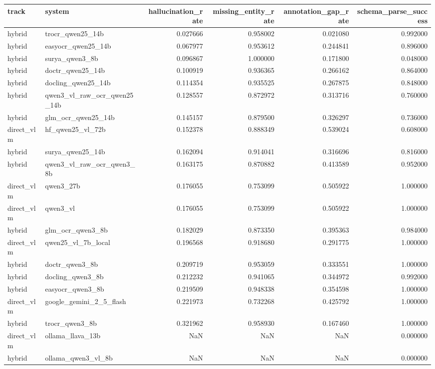 \begin{tabular}{llrrrr}
\toprule
track & system & hallucination\_rate & missing\_entity\_rate & annotation\_gap\_rate & schema\_parse\_success \\
\midrule
hybrid & trocr\_qwen25\_14b & 0.027666 & 0.958002 & 0.021080 & 0.992000 \\
hybrid & easyocr\_qwen25\_14b & 0.067977 & 0.953612 & 0.244841 & 0.896000 \\
hybrid & surya\_qwen3\_8b & 0.096867 & 1.000000 & 0.171800 & 0.048000 \\
hybrid & doctr\_qwen25\_14b & 0.100919 & 0.936365 & 0.266162 & 0.864000 \\
hybrid & docling\_qwen25\_14b & 0.114354 & 0.935525 & 0.267875 & 0.848000 \\
hybrid & qwen3\_vl\_raw\_ocr\_qwen25\_14b & 0.128557 & 0.872972 & 0.313716 & 0.760000 \\
hybrid & glm\_ocr\_qwen25\_14b & 0.145157 & 0.879500 & 0.326297 & 0.736000 \\
direct\_vlm & hf\_qwen25\_vl\_72b & 0.152378 & 0.888349 & 0.539024 & 0.608000 \\
hybrid & surya\_qwen25\_14b & 0.162094 & 0.914041 & 0.316696 & 0.816000 \\
hybrid & qwen3\_vl\_raw\_ocr\_qwen3\_8b & 0.163175 & 0.870882 & 0.413589 & 0.952000 \\
direct\_vlm & qwen3\_27b & 0.176055 & 0.753099 & 0.505922 & 1.000000 \\
direct\_vlm & qwen3\_vl & 0.176055 & 0.753099 & 0.505922 & 1.000000 \\
hybrid & glm\_ocr\_qwen3\_8b & 0.182029 & 0.873350 & 0.395363 & 0.984000 \\
direct\_vlm & qwen25\_vl\_7b\_local & 0.196568 & 0.918680 & 0.291775 & 1.000000 \\
hybrid & doctr\_qwen3\_8b & 0.209719 & 0.953059 & 0.333551 & 1.000000 \\
hybrid & docling\_qwen3\_8b & 0.212232 & 0.941065 & 0.344972 & 0.992000 \\
hybrid & easyocr\_qwen3\_8b & 0.219509 & 0.948338 & 0.354598 & 1.000000 \\
direct\_vlm & google\_gemini\_2\_5\_flash & 0.221973 & 0.732268 & 0.425792 & 1.000000 \\
hybrid & trocr\_qwen3\_8b & 0.321962 & 0.958930 & 0.167460 & 1.000000 \\
direct\_vlm & ollama\_llava\_13b & NaN & NaN & NaN & 0.000000 \\
hybrid & ollama\_qwen3\_vl\_8b & NaN & NaN & NaN & 0.000000 \\
\bottomrule
\end{tabular}
